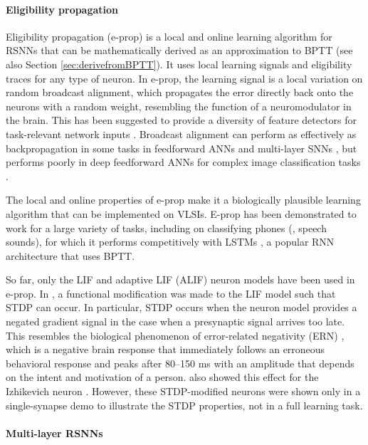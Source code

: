 \paragraph{Eligibility propagation}
Eligibility propagation (e-prop) \citep{bellec2020solution} is a local and online learning algorithm for RSNNs that can be mathematically derived as an approximation to BPTT (see also Section \ref{sec:derivefromBPTT}).
It uses local learning signals and eligibility traces for any type of neuron.
In e-prop, the learning signal is a local variation on random broadcast alignment, which propagates the error directly back onto the neurons with a random weight, resembling the function of a neuromodulator in the brain.
This has been suggested to provide a diversity of feature detectors for task-relevant network inputs \citep{bellec2020solution}.
Broadcast alignment can perform as effectively as backpropagation in some tasks in feedforward ANNs \citep{lillicrap2016random,nokland2016direct} and multi-layer SNNs \citep{samadi2017deep,clopath2010connectivity}, but performs poorly in deep feedforward ANNs for complex image classification tasks \citep{bartunov2018assessing}.

The local and online properties of e-prop make it a biologically plausible learning algorithm that can be implemented on VLSIs.
E-prop has been demonstrated to work for a large variety of tasks, including on classifying phones (\ie, speech sounds), for which it performs competitively with LSTMs \citep{graves2013speech}, a popular RNN architecture that uses BPTT.

So far, only the LIF and adaptive LIF (ALIF) neuron models have been used in e-prop. In \citet{traub2020learning}, a functional modification was made to the LIF model such that STDP can occur.
In particular, STDP occurs when the neuron model provides a negated gradient signal in the case when a presynaptic signal arrives too late.
This resembles the biological phenomenon of error-related negativity (ERN) \citep{nieuwenhuis2001error}, which is a negative brain response that immediately follows an erroneous behavioral response and peaks after 80--150 ms with an amplitude that depends on the intent and motivation of a person.
\citet{traub2020learning} also showed this effect for the Izhikevich neuron \citep{izhikevich2003simple}.
However, these STDP-modified neurons were shown only in a single-synapse demo to illustrate the STDP properties, not in a full learning task.

\paragraph{Multi-layer RSNNs}

